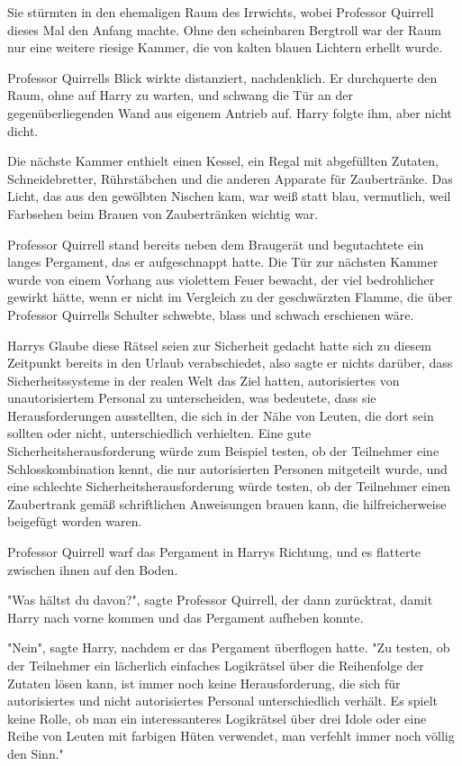 {Sie stürmten in den ehemaligen Raum des Irrwichts, wobei Professor Quirrell dieses Mal den Anfang machte. Ohne den scheinbaren Bergtroll war der Raum nur eine weitere riesige Kammer, die von kalten blauen Lichtern erhellt wurde.

Professor Quirrells Blick wirkte distanziert, nachdenklich. Er durchquerte den Raum, ohne auf Harry zu warten, und schwang die Tür an der gegenüberliegenden Wand aus eigenem Antrieb auf. Harry folgte ihm, aber nicht dicht.

Die nächste Kammer enthielt einen Kessel, ein Regal mit abgefüllten Zutaten, Schneidebretter, Rührstäbchen und die anderen Apparate für Zaubertränke. Das Licht, das aus den gewölbten Nischen kam, war weiß statt blau, vermutlich, weil Farbsehen beim Brauen von Zaubertränken wichtig war.

Professor Quirrell stand bereits neben dem Braugerät und begutachtete ein langes Pergament, das er aufgeschnappt hatte. Die Tür zur nächsten Kammer wurde von einem Vorhang aus violettem Feuer bewacht, der viel bedrohlicher gewirkt hätte, wenn er nicht im Vergleich zu der geschwärzten Flamme, die über Professor Quirrells Schulter schwebte, blass und schwach erschienen wäre.

Harrys Glaube diese Rätsel seien zur Sicherheit gedacht hatte sich zu diesem Zeitpunkt bereits in den Urlaub verabschiedet, also sagte er nichts darüber, dass Sicherheitssysteme in der realen Welt das Ziel hatten, autorisiertes von unautorisiertem Personal zu unterscheiden, was bedeutete, dass sie Herausforderungen ausstellten, die sich in der Nähe von Leuten, die dort sein sollten oder nicht, unterschiedlich verhielten. Eine gute Sicherheitsherausforderung würde zum Beispiel testen, ob der Teilnehmer eine Schlosskombination kennt, die nur autorisierten Personen mitgeteilt wurde, und eine schlechte Sicherheitsherausforderung würde testen, ob der Teilnehmer einen Zaubertrank gemäß schriftlichen Anweisungen brauen kann, die hilfreicherweise beigefügt worden waren.

Professor Quirrell warf das Pergament in Harrys Richtung, und es flatterte zwischen ihnen auf den Boden.

"Was hältst du davon?", sagte Professor Quirrell, der dann zurücktrat, damit Harry nach vorne kommen und das Pergament aufheben konnte.

"Nein", sagte Harry, nachdem er das Pergament überflogen hatte. "Zu testen, ob der Teilnehmer ein lächerlich einfaches Logikrätsel über die Reihenfolge der Zutaten lösen kann, ist immer noch keine Herausforderung, die sich für autorisiertes und nicht autorisiertes Personal unterschiedlich verhält. Es spielt keine Rolle, ob man ein interessanteres Logikrätsel über drei Idole oder eine Reihe von Leuten mit farbigen Hüten verwendet, man verfehlt immer noch völlig den Sinn."

}
